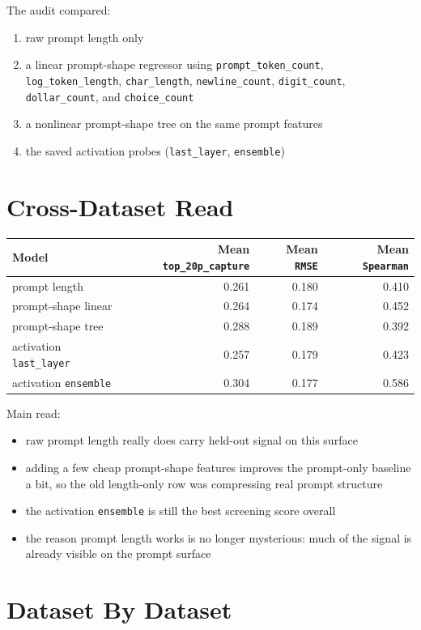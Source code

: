 \documentclass[11pt]{article}
\begin{document}
The audit compared:
\begin{enumerate}[leftmargin=1.5em]
\item raw prompt length only
\item a linear prompt-shape regressor using \texttt{prompt\_token\_count}, \texttt{log\_token\_length}, \texttt{char\_length}, \texttt{newline\_count}, \texttt{digit\_count}, \texttt{dollar\_count}, and \texttt{choice\_count}
\item a nonlinear prompt-shape tree on the same prompt features
\item the saved activation probes (\texttt{last\_layer}, \texttt{ensemble})
\end{enumerate}

\section*{Cross-Dataset Read}
\begin{center}
\small
\begin{tabular}{@{}lrrr@{}}
\toprule
Model & Mean \texttt{top\_20p\_capture} & Mean \texttt{RMSE} & Mean \texttt{Spearman} \\
\midrule
prompt length & 0.261 & 0.180 & 0.410 \\
prompt-shape linear & 0.264 & 0.174 & 0.452 \\
prompt-shape tree & 0.288 & 0.189 & 0.392 \\
activation \texttt{last\_layer} & 0.257 & 0.179 & 0.423 \\
activation \texttt{ensemble} & 0.304 & 0.177 & 0.586 \\
\bottomrule
\end{tabular}
\end{center}

Main read:
\begin{itemize}[leftmargin=1.5em]
\item raw prompt length really does carry held-out signal on this surface
\item adding a few cheap prompt-shape features improves the prompt-only baseline a bit, so the old length-only row was compressing real prompt structure
\item the activation \texttt{ensemble} is still the best screening score overall
\item the reason prompt length works is no longer mysterious: much of the signal is already visible on the prompt surface
\end{itemize}

\section*{Dataset By Dataset}
\end{document}
